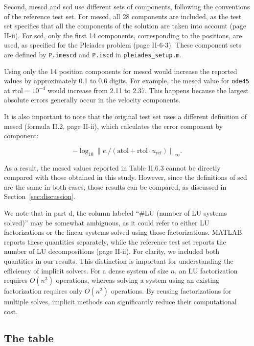 \documentclass[11pt]{article}
\begin{document}
Second, mescd and scd use different sets of components, following
the conventions of the reference test set. For mescd, all 28
components are included, as the test set specifies that
all the components of the solution are taken into account
(page II-ii). For scd, only the first 14 components, corresponding
to the positions, are used, as specified for the Pleiades problem
(page II-6-3). These component sets are defined by
\texttt{P.imescd} and \texttt{P.iscd} in
\texttt{pleiades\_setup.m}.

Using only the 14 position components for mescd would increase
the reported values by approximately 0.1 to 0.6 digits. For
example, the mescd value for \texttt{ode45} at
$\mathrm{rtol}=10^{-4}$ would increase from 2.11 to 2.37.
This happens because the largest absolute errors generally
occur in the velocity components.

It is also important to note that the original test set uses a
different definition of mescd (formula II.2, page II-ii),
which calculates the error component by component:

\[
-\log_{10}\left\lVert
e \mathbin{./}
\left(\mathrm{atol}+\mathrm{rtol}\cdot u_{\mathrm{ref}}\right)
\right\rVert_{\infty}.
\]

As a result, the mescd values reported in Table II.6.3 cannot
be directly compared with those obtained in this study.
However, since the definitions of scd are the same in both cases, 
those results can be compared, as discussed in
Section~\ref{sec:discussion}.


We note that in part d, the column labeled ``\#LU (number of LU systems solved)''
may be somewhat ambiguous, as it could refer to either LU factorizations
or the linear systems solved using those factorizations. MATLAB reports
these quantities separately, while the reference test set reports
the number of LU decompositions (page II-ii). For clarity, we included both
quantities in our results. This distinction is important
for understanding the efficiency of implicit solvers. For a dense
system of size $n$, an LU factorization requires $O(n^3)$ operations,
whereas solving a system using an existing factorization requires
only $O(n^2)$ operations. By reusing factorizations for multiple
solves, implicit methods can significantly reduce their computational
cost.

\subsection*{The table}
\end{document}
